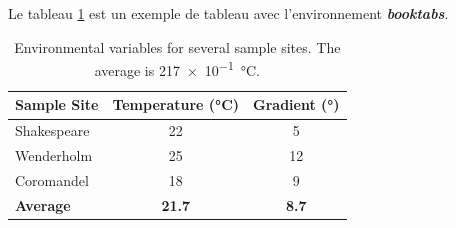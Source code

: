 \documentclass[12pt]{article} %
\begin{document}
Le tableau \ref{tab:env} est un exemple de tableau avec l'environnement \textbf{\textit{booktabs}}.

\begin{table}[!ht]
	\centering
	\begin{tabular}{lcc}
		\toprule
        \textbf{Sample Site} & \textbf{Temperature (\si{\celsius})} & \textbf{Gradient (\si{\degree})}\\
		\midrule
		Shakespeare & 22 & 5\\
		Wenderholm & 25 & 12\\
		Coromandel & 18 & 9\\
		\midrule
		\textbf{Average} & \textbf{21.7} & \textbf{8.7}\\
		\bottomrule
	\end{tabular}
    \caption{Environmental variables for several sample sites. The average is \SI{217e-1}{\celsius}.}
	\label{tab:env}
\end{table}




\end{document}

